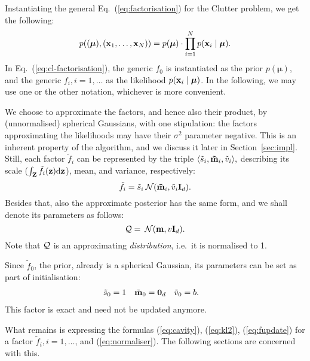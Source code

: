 \documentclass[11pt]{article}
\begin{document}
Instantiating the general Eq.~(\ref{eq:factorisation}) for the Clutter 
problem, we get the following:
\begin{equation}
	p((\boldsymbol{\mu}), (\mathbf{x}_1, \dots, \mathbf{x}_N)) = p(\boldsymbol{\mu}) \cdot \prod_{i 
	= 1}^{N}{p(\mathbf{x}_i\mid\boldsymbol{\mu})}.
	\label{eq:cl-factorisation}
\end{equation}
In Eq.~(\ref{eq:cl-factorisation}), the generic $f_0$ is instantiated as 
the prior $p(\boldsymbol{\mu})$, and the generic $f_i, i = 1,\dots$ as the likelihood
$p(\mathbf{x}_i\mid\boldsymbol{\mu})$. In the following, we may use one or the other notation, 
whichever is more convenient.

We choose to approximate the factors, and hence also their product, by 
(unnormalised) spherical Gaussians, with one stipulation: the factors 
approximating the likelihoods may have their $\sigma^2$ parameter negative.  
This is an inherent property of the algorithm, and we discuss it later in 
Section~\ref{sec:impl}. Still, each factor $\tilde{f}_i$ can be represented 
by the triple $\langle \tilde{s}_i, \mathbf{\tilde{m}}_i, \tilde{v}_i\rangle,$ 
describing its scale ($\int_{\mathbf{Z}} \tilde{f}_i(\mathbf{z})\mathrm{d}\mathbf{z}$), 
mean, and variance, respectively:
\begin{equation}
	\tilde{f}_i = \tilde{s}_i\:\mathcal{N}(\mathbf{\tilde{m}}_i, \tilde{v}_i\mathbf{I}_{d}).
	\label{eq:fac-notation}
\end{equation}
Besides that, also the approximate posterior has the same form, and we 
shall denote its parameters as follows:
\begin{equation}
	\mathcal{Q} = \:\mathcal{N}(\mathbf{m}, v\mathbf{I}_{d}).
	\label{eq:kve-notation}
\end{equation}
Note that $\mathcal{Q}$ is an approximating \emph{distribution}, i.e.\ it is 
normalised to 1.

Since $\tilde{f}_0$, the prior, already is a spherical Gaussian, its 
parameters can be set as part of initialisation:
\begin{align}
	\tilde{s}_0 &= 1 &
	\tilde{\mathbf{m}}_0 &= \mathbf{0}_d &
	\tilde{v}_0 &= b.
\end{align}
This factor is exact and need not be updated anymore.

What remains is expressing the formulas (\ref{eq:cavity}), (\ref{eq:kl2}), 
(\ref{eq:fupdate}) for a factor $\tilde{f}_i, i=1, \dots$, and 
(\ref{eq:normaliser}).  The following sections are concerned with this.

\end{document}
